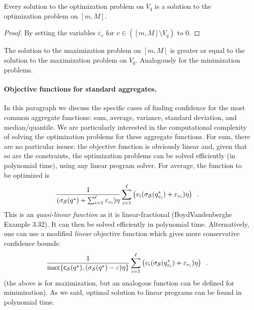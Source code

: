 \begin{lemma}\label{lem:equivoptprobs}
  Every solution to the optimization problem on $V_q$ is a solution to the
  optimization problem on $[m,M]$.
\end{lemma}
\begin{proof}
  By setting the variables $\varepsilon_{v}$ for $v\in([m,M]\setminus V_q)$ to $0$.
\end{proof}

\begin{corollary}
  The solution to the maximization problem on $[m,M]$ is greater or equal to the
  solution to the maximization problem on $V_q$. Analogously for the
  minimization problems.
\end{corollary}

\paragraph{Objective functions for standard aggregates.}
In this paragraph we
discuss the specific cases of finding confidence for the most common aggregate
functions: sum, average, variance, standard deviation, and median/quantile. We
are particularly interested in the computational complexity of solving the
optimization problems for these aggregate functions.
For sum, there are no particular issues: the objective function is obviously
linear and, given that so are the constraints, the optimization problems can be
solved efficiently (in polynomial time), using any linear program solver.
For average, the function to be optimized is
\[
\frac{1}{(\sigma_{\cal S}(q^*)+\sum_{i=1}^\ell\varepsilon_{v_i})\eta}\sum_{i=1}^\ell
\left(v_i(\sigma_{\cal S}(q^*_{v_i})+\varepsilon_{v_i})\eta\right)\enspace.
\]
This is an \emph{quasi-linear function} as it is linear-fractional\citemissing
(BoydVandenberghe Example 3.32). It can then be solved efficiently in polynomial
time\citemissing {}. Alternatively, one
can use a modified \emph{linear} objective function which gives more
conservative confidence bounds:
\[
\frac{1}{\max\{\mathsf{c}_{\cal S}(q^*),(\sigma_{\cal S}(q^*)-\varepsilon)\eta\}}\sum_{i=1}^\ell
\left(v_i(\sigma_{\cal S}(q^*_{v_i})+\varepsilon_{v_i})\eta\right)\enspace.
\]
(the above is for maximization, but an analogous function can be defined for
minimization). As we said, optimal solution to linear programs can be found in
polynomial time.

